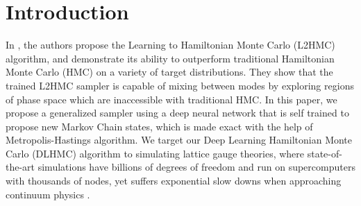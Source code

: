 \documentclass{article} %
\begin{document}
\section{\label{sec:introduction}Introduction}
In \citet{levy2017}, the authors propose the Learning to Hamiltonian Monte Carlo (L2HMC) algorithm, and demonstrate
its ability to outperform traditional Hamiltonian Monte Carlo (HMC) on a variety of %
target
distributions.
%
They show that the trained L2HMC sampler is capable of mixing between modes by exploring regions of phase space which are %
inaccessible with traditional HMC.
%
In this paper, we propose a generalized sampler using a deep neural network that is self trained to propose new Markov Chain states,
which is made exact with the help of Metropolis-Hastings \citep{zbMATH03349185} algorithm.
We target our Deep Learning Hamiltonian Monte Carlo (DLHMC) algorithm to simulating lattice gauge theories,
where state-of-the-art simulations have billions of degrees of freedom and run on supercomputers with thousands of nodes,
yet suffers exponential slow downs when approaching continuum physics \citep{schaefer2009investigating,cossu2018testing}.
%
\end{document}
